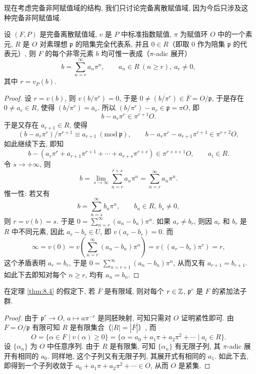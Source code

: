 现在考虑完备非阿赋值域的结构, 我们只讨论完备离散赋值域, 因为今后只涉及这种完备非阿赋值域.

\begin{theorem}\label{thm:8.4}
设 $(F,P)$ 是完备离散赋值域, $v$ 是 $P$ 中标准指数赋值, $\pi$ 为赋值环 $O$ 中的一个素元, $R$ 是 $O$ 对素理想 $\mathfrak{p}$ 的陪集完全代表系, 并且 $0\in R$（即取 $0$ 作为陪集 $\mathfrak{p}$ 的代表元）, 则 $F$ 的每个非零元素 $b$ 均可惟一表成（$\pi$-adic 展开）
\[
  b=\sum_{n=r}^{\infty}a_n\pi^n,\qquad a_n\in R\ (n\geqslant r),\ a_r\neq 0,
\]
其中 $r=v_P(b)$.
\end{theorem}

\begin{proof}
设 $r=v(b)$, 则 $v(b/\pi^r)=0$, 于是 $0\neq\overline{(b/\pi^r)}\in\overline{F}=O/\mathfrak{p}$, 于是存在 $0\neq a_r\in R$, 使得 $\overline{(b/\pi^r)}=\overline{a}_r$. 所以 $(b/\pi^r)-a_r\in\mathfrak{p}=\pi O$, 即
\[
  b-a_r\pi^r\in\pi^{r+1}O.
\]
于是又存在 $a_{r+1}\in R$, 使得
\[
  (b-a_r\pi^r)/\pi^{r+1}\equiv a_{r+1}\ (\mathrm{mod}\ \mathfrak{p}),
  \qquad b-a_r\pi^r-a_{r+1}\pi^{r+1}\in\pi^{r+2}O,
\]
如此继续下去, 即知
\[
  b-\left(a_r\pi^r+a_{r+1}\pi^{r+1}+\cdots+a_{r+s}\pi^{r+s}\right)\in\pi^{r+s+1}O,\qquad a_i\in R.
\]
令 $s\to+\infty$, 则
\[
  b=\lim_{s\to\infty}\sum_{n=r}^{r+s}a_n\pi^n=\sum_{n=r}^{\infty}a_n\pi^n.
\]
惟一性: 若又有
\[
  b=\sum_{n=s}^{\infty}b_n\pi^n,\qquad b_n\in R,\ b_s\neq 0,
\]
则 $r=v(b)=s$. 于是 $0=\sum_{n=r}^{\infty}(a_n-b_n)\pi^n$. 如果 $a_r\neq b_r$, 则因 $a_r$ 和 $b_r$ 是 $R$ 中不同元素, 因此 $a_r-b_r\in U$, 即 $v(a_r-b_r)=0$. 而
\[
  \infty=v(0)=v\left(\sum_{n=r}^{\infty}(a_n-b_n)\pi^n\right)=v\left((a_r-b_r)\pi^r\right)=r,
\]
这个矛盾表明 $a_r=b_r$, 于是 $0=\sum_{n=r+1}^{\infty}(a_n-b_n)\pi^n$, 从而又有 $a_{r+1}=b_{r+1}$. 如此下去即知对每个 $n\geqslant r$, 均有 $a_n=b_n$.
\end{proof}

\begin{corollary}
在定理 \ref{thm:8.4} 的假定下, 若 $\overline{F}$ 是有限域, 则对每个 $r\in\mathbb{Z}$, $\mathfrak{p}^r$ 是 $F$ 的紧加法子群.
\end{corollary}

\begin{proof}
由于 $\mathfrak{p}^r\to O$, $a\mapsto a\pi^{-r}$ 是同胚映射, 可知只需对 $O$ 证明紧性即可. 由 $\overline{F}=O/\mathfrak{p}$ 有限可知 $R$ 是有限集合（$|R|=|\overline{F}|$）, 而
\[
  O=\{\alpha\in F\mid v(\alpha)\geqslant 0\}
  =\{\alpha=a_0+a_1\pi+a_2\pi^2+\cdots\mid a_i\in R\}.
\]
设 $\{\alpha_n\}$ 为 $O$ 中任意序列. 由于 $R$ 是有限集, 可知 $\{\alpha_n\}$ 有无限子列, 其 $\pi$-adic 展开有相同的 $a_0$. 同样地, 这个子列又有无限子列, 其展开式有相同的 $a_1$. 如此下去, 即得到一个子列收敛于 $a_0+a_1\pi+a_2\pi^2+\cdots\in O$, 从而 $O$ 是紧集.
\end{proof}

